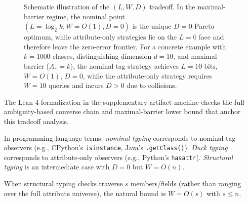 \begin{figure}[t]
\centering
{}
\caption{Schematic illustration of the $(L, W, D)$ tradeoff. In the maximal-barrier regime, the nominal point $(L=\log_2 k, W=O(1), D=0)$ is the unique $D=0$ Pareto optimum, while attribute-only strategies lie on the $L=0$ face and therefore leave the zero-error frontier. For a concrete example with $k = 1000$ classes, distinguishing dimension $d = 10$, and maximal barrier ($A_\pi = k$), the nominal-tag strategy achieves $L = 10$ bits, $W = O(1)$, $D = 0$, while the attribute-only strategy requires $W = 10$ queries and incurs $D > 0$ due to collisions.}
\label{fig:lwd-tradeoff}
\end{figure}

The Lean 4 formalization in the supplementary artifact machine-checks the full ambiguity-based converse chain and maximal-barrier lower bound that anchor this tradeoff analysis.

\begin{remark}
In programming language terms: \emph{nominal typing} corresponds to nominal-tag observers (e.g., CPython's \texttt{isinstance}, Java's \texttt{.getClass()}). \emph{Duck typing} corresponds to attribute-only observers (e.g., Python's \texttt{hasattr}). \emph{Structural typing} is an intermediate case with $D = 0$ but $W = O(n)$.
\end{remark}

\begin{remark}
When structural typing checks traverse $s$ members/fields (rather than ranging over the full attribute universe), the natural bound is $W = O(s)$ with $s \le n$.
\end{remark}
